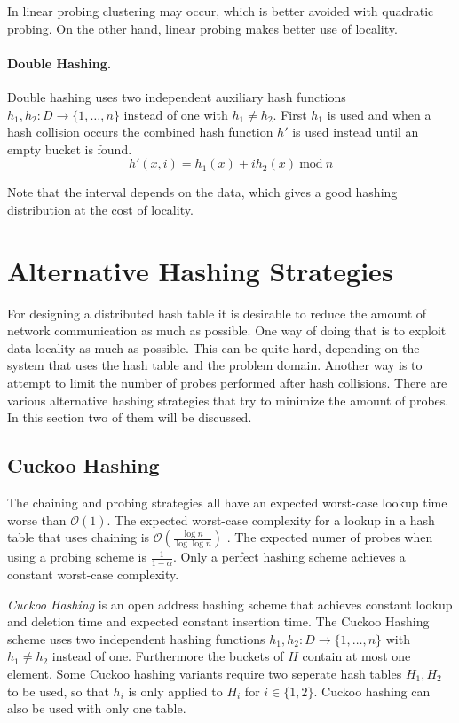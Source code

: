 In linear probing clustering may occur, which is better avoided with quadratic probing. On the other hand, linear probing makes better use of locality. 

\paragraph{Double Hashing.}
Double hashing uses two independent auxiliary hash functions $h_1, h_2 : D \rightarrow \{ 1, \dots, n \}$ instead of one with $h_1 \not = h_2$. First $h_1$ is used and when a hash collision occurs the combined hash function $h'$ \cite{Cormen:2009:IAT:1614191} is used instead until an empty bucket is found.
\begin{equation}
	h'(x, i) = h_1(x) + ih_2(x) \ \text{mod} \ n
\end{equation}

Note that the interval depends on the data, which gives a good hashing distribution at the cost of locality.

\section{Alternative Hashing Strategies}
For designing a distributed hash table it is desirable to reduce the amount of network communication as much as possible. One way of doing that is to exploit data locality as much as possible. This can be quite hard, depending on the system that uses the hash table and the problem domain. Another way is to attempt to limit the number of probes performed after hash collisions. There are various alternative hashing strategies that try to minimize the amount of probes. In this section two of them will be discussed.

\subsection{Cuckoo Hashing}
The chaining and probing strategies all have an expected worst-case lookup time worse than $\mathcal{O}(1)$. The expected worst-case complexity for a lookup in a hash table that uses chaining is $\mathcal{O}(\frac{\log n}{\log \log n})$ \cite{Gonnet:1981:ELL:322248.322254}. The expected numer of probes when using a probing scheme is $\frac{1}{1 - \alpha}$. Only a perfect hashing scheme achieves a constant worst-case complexity.

\emph{Cuckoo Hashing} \cite{Pagh01cuckoohashing, Pagh:2004:CH:1006424.1006426} is an open address hashing scheme that achieves constant lookup and deletion time and expected constant insertion time. The Cuckoo Hashing scheme uses two independent hashing functions $h_1, h_2 : D \rightarrow \{ 1, \dots, n \}$ with $h_1 \not = h_2$ instead of one. Furthermore the buckets of $H$ contain at most one element. Some Cuckoo hashing variants require two seperate hash tables $H_1, H_2$ to be used, so that $h_i$ is only applied to $H_i$ for $i \in \{ 1, 2 \}$. Cuckoo hashing can also be used with only one table. 


